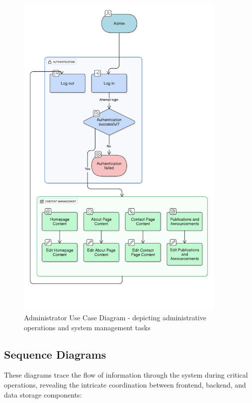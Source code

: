 \documentclass[12pt,a4paper]{article}
\begin{document}
\begin{itemize}
    \begin{figure}[!htbp]
        \centering
        \includegraphics[width=0.9\textwidth]{administrator-usecase-diagram.png}
        \caption{Administrator Use Case Diagram - depicting administrative operations and system management tasks}
        \label{fig:administrator-usecase}
    \end{figure}
    \FloatBarrier
\end{itemize}

\subsection{Sequence Diagrams}

These diagrams trace the flow of information through the system during critical operations, revealing the intricate coordination between frontend, backend, and data storage components:
\end{document}
